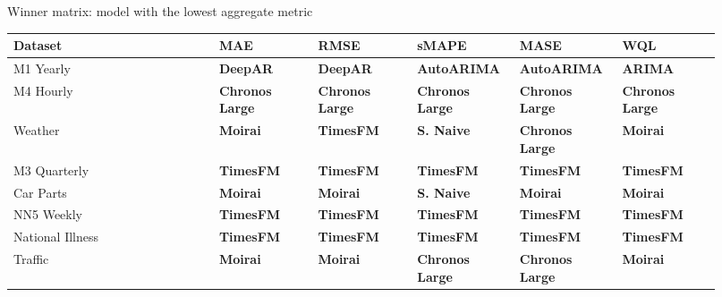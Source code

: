 \begin{frame}{Winner matrix: model with the lowest aggregate metric}
  \vspace{-0.10cm}
  \centering
  \tiny
  \renewcommand{\arraystretch}{1.28}
  \setlength{\tabcolsep}{2.5pt}
  \begin{tabular}{L{0.27\linewidth} C{0.13\linewidth} C{0.13\linewidth} C{0.13\linewidth} C{0.13\linewidth} C{0.13\linewidth}}
    \toprule
    \textbf{Dataset} & \textbf{MAE} & \textbf{RMSE} & \textbf{sMAPE} & \textbf{MASE} & \textbf{WQL} \\
    \midrule
    M1 Yearly & \textbf{DeepAR} & \textbf{DeepAR} & \textbf{AutoARIMA} & \textbf{AutoARIMA} & \textbf{ARIMA} \\
    M4 Hourly & \textbf{Chronos Large} & \textbf{Chronos Large} & \textbf{Chronos Large} & \textbf{Chronos Large} & \textbf{Chronos Large} \\
    Weather & \textbf{Moirai} & \textbf{TimesFM} & \textbf{S. Naive} & \textbf{Chronos Large} & \textbf{Moirai} \\
    M3 Quarterly & \textbf{TimesFM} & \textbf{TimesFM} & \textbf{TimesFM} & \textbf{TimesFM} & \textbf{TimesFM} \\
    Car Parts & \textbf{Moirai} & \textbf{Moirai} & \textbf{S. Naive} & \textbf{Moirai} & \textbf{Moirai} \\
    NN5 Weekly & \textbf{TimesFM} & \textbf{TimesFM} & \textbf{TimesFM} & \textbf{TimesFM} & \textbf{TimesFM} \\
    National Illness & \textbf{TimesFM} & \textbf{TimesFM} & \textbf{TimesFM} & \textbf{TimesFM} & \textbf{TimesFM} \\
    Traffic & \textbf{Moirai} & \textbf{Moirai} & \textbf{Chronos Large} & \textbf{Chronos Large} & \textbf{Moirai} \\

\end{tabular}
\end{frame}
